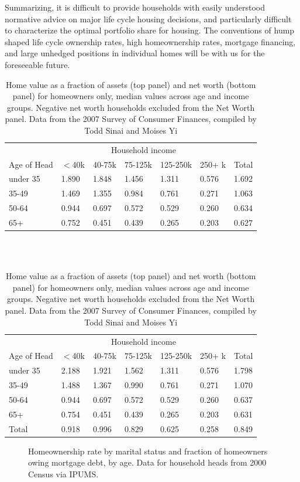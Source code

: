 \documentclass[12pt]{article}
\begin{document}
Summarizing, it is difficult to provide households with easily understood
normative advice on major life cycle housing decisions, and particularly
difficult to characterize the optimal portfolio share for housing.  The
conventions of hump shaped life cycle ownership rates, high homeownership rates,
mortgage financing, and large unhedged positions in individual homes will be
with us for the foreseeable future.





\begin{table}
	\caption{\label{tab:assets} Home value as a fraction of assets (top
	panel) and net worth (bottom panel) for homeowners only, median
	values across age and income groups.  Negative net worth households
	excluded from the Net Worth panel.  Data from the 2007 Survey of
	Consumer Finances, compiled by Todd Sinai and Moises Yi}
	\begin{tabular}{l|llllll}
		\hline
		&                   \multicolumn{5}{c}{Household income}\\ 
		Age of Head      &     $<$40k    & 40-75k   &75-125k  &125-250k    &250+ k
		&Total\\
		\hline\hline
		 under 35& 1.890& 1.848& 1.456& 1.311& 0.576& 1.692\\
		 35-49& 1.469& 1.355& 0.984& 0.761& 0.271& 1.063\\
		 50-64& 0.944& 0.697& 0.572& 0.529& 0.260& 0.634\\
		 65+& 0.752& 0.451& 0.439& 0.265& 0.203& 0.627\\
		\hline
	\end{tabular}
	\\
	\\
	\begin{tabular}{l|llllll}
		\hline
		&                   \multicolumn{5}{c}{Household income}\\ 
		Age of Head      &     $<$40k    & 40-75k   &75-125k  &125-250k    &250+ k
		&Total\\
		\hline\hline
		 under 35 &2.188& 1.921& 1.562& 1.311& 0.576& 1.798\\
		35-49 &1.488& 1.367& 0.990& 0.761& 0.271& 1.070\\
		50-64 &0.944& 0.697& 0.572& 0.529& 0.260& 0.637\\
		  65+ &0.754& 0.451& 0.439& 0.265& 0.203& 0.631\\
		Total &0.918& 0.996& 0.829& 0.625& 0.258& 0.849\\
		\hline
	\end{tabular}
\end{table}

\begin{figure}
	\caption{\label{fig:own_age} Homeownership rate by marital status and fraction
	of homeowners owing mortgage debt, by age.  Data for household heads from 2000 Census via IPUMS.}
\end{figure}
\end{document}
